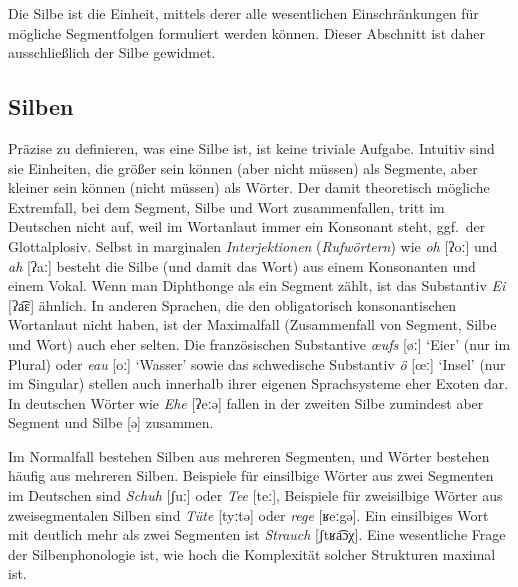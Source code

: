 
Die Silbe ist die Einheit, mittels derer alle wesentlichen Einschränkungen für mögliche Segmentfolgen formuliert werden können.
Dieser Abschnitt ist daher ausschließlich der Silbe gewidmet.

\subsection{Silben}
\label{sec:silben}


Präzise zu definieren, was eine Silbe ist, ist keine triviale Aufgabe.
Intuitiv sind sie Einheiten, die größer sein können (aber nicht müssen) als Segmente, aber kleiner sein können (nicht müssen) als Wörter.
Der damit theoretisch mögliche Extremfall, bei dem Segment, Silbe und Wort zusammenfallen, tritt im Deutschen nicht auf, weil im Wortanlaut immer ein Konsonant steht, ggf.\ der Glottalplosiv.
Selbst in marginalen \textit{Interjektionen} (\textit{Rufwörtern}) wie \textit{oh} [ʔoː] und \textit{ah} [ʔaː] besteht die Silbe (und damit das Wort) aus einem Konsonanten und einem Vokal.
Wenn man Diphthonge als ein Segment zählt, ist das Substantiv \textit{Ei} [ʔa͡ɛ] ähnlich.
In anderen Sprachen, die den obligatorisch konsonantischen Wortanlaut nicht haben, ist der Maximalfall (Zusammenfall von Segment, Silbe und Wort) auch eher selten.
Die französischen Substantive \textit{œufs} [øː] `Eier' (nur im Plural) oder \textit{eau} [oː] `Wasser' sowie das schwedische Substantiv \textit{ö} [œː] `Insel' (nur im Singular) stellen auch innerhalb ihrer eigenen Sprachsysteme eher Exoten dar.
In deutschen Wörter wie \textit{Ehe} [ʔeːə] fallen in der zweiten Silbe zumindest aber Segment und Silbe [ə] zusammen.

Im Normalfall bestehen Silben aus mehreren Segmenten, und Wörter bestehen häufig aus mehreren Silben.
Beispiele für einsilbige Wörter aus zwei Segmenten im Deutschen sind \textit{Schuh} [ʃuː] oder \textit{Tee} [teː], Beispiele für zweisilbige Wörter aus zweisegmentalen Silben sind \textit{Tüte} [tyːtə] oder \textit{rege} [ʁeːgə].
Ein einsilbiges Wort mit deutlich mehr als zwei Segmenten ist \textit{Strauch} [ʃtʁa͡ɔχ].
Eine wesentliche Frage der Silbenphonologie ist, wie hoch die Komplexität solcher Strukturen maximal ist.

